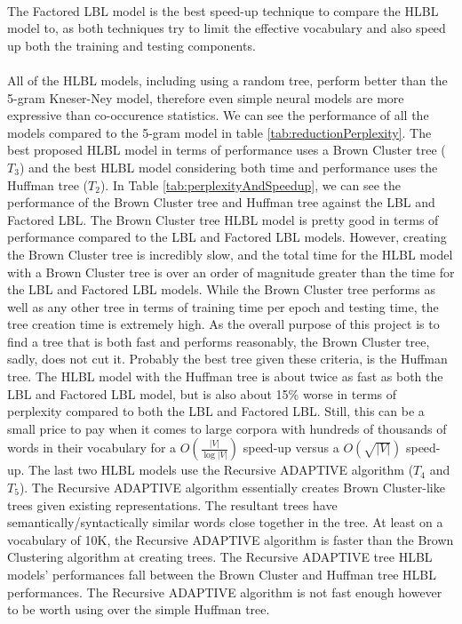 \paragraph{}
The Factored LBL model is the best speed-up technique to compare the HLBL model to, as both techniques try to limit the effective vocabulary and also speed up both the training and testing components.

\paragraph{}
All of the HLBL models, including using a random tree, perform better than the 5-gram Kneser-Ney model,  therefore even simple neural models are more expressive than co-occurence statistics. We can see the performance of all the models compared to the 5-gram model in table \ref{tab:reductionPerplexity}. The best proposed HLBL model in terms of performance uses a Brown Cluster tree ($T_3$) and the best HLBL model considering both time and performance uses the Huffman tree ($T_2$). In Table \ref{tab:perplexityAndSpeedup}, we can see the performance of the Brown Cluster tree and Huffman tree against the LBL and Factored LBL. The Brown Cluster tree HLBL model is pretty good in terms of performance compared to the LBL and Factored LBL models. However, creating the Brown Cluster tree is incredibly slow, and the total time for the HLBL model with a Brown Cluster tree is over an order of magnitude greater than the time for the LBL and Factored LBL models. While the Brown Cluster tree performs as well as any other tree in terms of training time per epoch and testing time, the tree creation time is extremely high. As the overall purpose of this project is to find a tree that is both fast and performs reasonably, the Brown Cluster tree, sadly, does not cut it. Probably the best tree given these criteria, is the Huffman tree. The HLBL model with the Huffman tree is about twice as fast as both the LBL and Factored LBL model, but is also about 15\% worse in terms of perplexity compared to both the LBL and Factored LBL. Still, this can be a small price to pay when it comes to large corpora with hundreds of thousands of words in their vocabulary for a $O(\frac{|V|}{\log|V|})$ speed-up versus a $O(\sqrt{|V|})$ speed-up. The last two HLBL models use the Recursive ADAPTIVE algorithm ($T_4$ and $T_5$). The Recursive ADAPTIVE algorithm essentially creates Brown Cluster-like trees given existing representations. The resultant trees have semantically/syntactically similar words close together in the tree. At least on a vocabulary of 10K, the Recursive ADAPTIVE algorithm is faster than the Brown Clustering algorithm at creating trees. The Recursive ADAPTIVE tree HLBL models' performances fall between the Brown Cluster and Huffman tree HLBL performances. The Recursive ADAPTIVE algorithm is not fast enough however to be worth using over the simple Huffman tree. 

